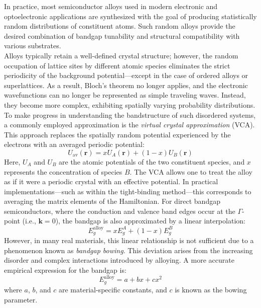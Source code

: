 In practice, most semiconductor alloys used in modern electronic and optoelectronic applications are synthesized with the goal of producing statistically random distributions of constituent atoms. Such random alloys provide the desired combination of bandgap tunability and structural compatibility with various substrates.\\
Alloys typically retain a well-defined crystal structure; however, the random occupation of lattice sites by different atomic species eliminates the strict periodicity of the background potential—except in the case of ordered alloys or superlattices. As a result, Bloch’s theorem no longer applies, and the electronic wavefunctions can no longer be represented as simple traveling waves. Instead, they become more complex, exhibiting spatially varying probability distributions.
To make progress in understanding the bandstructure of such disordered systems, a commonly employed approximation is the \textit{virtual crystal approximation} (VCA). This approach replaces the spatially random potential experienced by the electrons with an averaged periodic potential:
\begin{equation}
	U_{\text{av}}(\mathbf{r}) = x U_A(\mathbf{r}) + (1 - x) U_B(\mathbf{r})
\end{equation}
Here, \( U_A \) and \( U_B \) are the atomic potentials of the two constituent species, and \( x \) represents the concentration of species \( B \). The VCA allows one to treat the alloy as if it were a periodic crystal with an effective potential.
In practical implementations—such as within the tight-binding method—this corresponds to averaging the matrix elements of the Hamiltonian. For direct bandgap semiconductors, where the conduction and valence band edges occur at the \(\Gamma\)-point (i.e., \( \mathbf{k} = 0 \)), the bandgap is also approximated by a linear interpolation:
\begin{equation}
	E_g^{\text{alloy}} = x E_g^A + (1 - x) E_g^B
\end{equation}
However, in many real materials, this linear relationship is not sufficient due to a phenomenon known as \textit{bandgap bowing}. This deviation arises from the increasing disorder and complex interactions introduced by alloying. A more accurate empirical expression for the bandgap is:
\begin{equation}
	E_g^{\text{alloy}} = a + bx + c x^2
\end{equation}
where \( a \), \( b \), and \( c \) are material-specific constants, and \( c \) is known as the bowing parameter.
